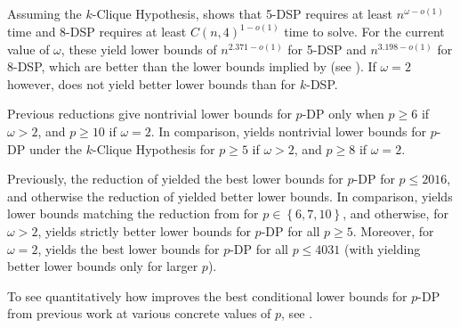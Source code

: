 \documentclass[11pt]{article}
\newcommand{\set}[1]{\left\{#1\right\}}
\theoremstyle{definition}
\begin{document}
Assuming the \textsf{$k$-Clique Hypothesis},  shows that \textsf{5-DSP} requires at least $n^{\omega - o(1)}$ time and \textsf{8-DSP} requires at least $C(n,4)^{1-o(1)}$ time to solve.
For the current value of $\omega$, these yield lower bounds of $n^{2.371-o(1)}$ for \textsf{5-DSP} and $n^{3.198-o(1)}$ for \textsf{8-DSP}, which are better than the lower bounds implied by  (see ).
If $\omega = 2$ however,  does not yield better lower bounds than  for \textsf{$k$-DSP}.

Previous reductions give nontrivial lower bounds for \textsf{$p$-DP} only when $p\ge 6$ if $\omega > 2$, and  $p\ge 10$ if $\omega = 2$.
In comparison,
 yields nontrivial lower bounds for \textsf{$p$-DP} under the \textsf{$k$-Clique Hypothesis} for $p\ge 5$ if $\omega > 2$, and $p\ge 8$ if $\omega = 2$.

Previously, the reduction of \cite{Slivkins2010} yielded the best lower bounds for \textsf{$p$-DP} for $p\le 2016$, and otherwise the reduction of \cite{Chitnis2021} yielded better lower bounds.
In comparison,  yields lower bounds matching the reduction from \cite{Slivkins2010}  for $p\in\set{6,7,10}$, and  otherwise, for $\omega > 2$, yields strictly better lower bounds for \textsf{$p$-DP} for all $p \ge 5$.
Moreover, for $\omega = 2$,   yields the best lower bounds for \textsf{$p$-DP} for all $p\le 4031$ (with \cite{Chitnis2021} yielding better lower bounds only for larger $p$). 

To see quantitatively how  improves the best conditional lower bounds for \textsf{$p$-DP} from previous work at various concrete values of $p$, see .
\end{document}
